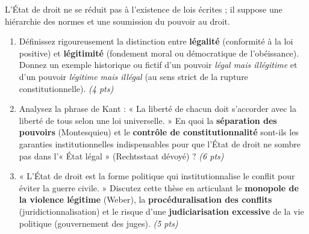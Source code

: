 \documentclass[11pt]{article}
\begin{document}
\begin{exercice}
L'État de droit ne se réduit pas à l'existence de lois écrites ; il suppose une hiérarchie des normes et une soumission du pouvoir au droit.

\begin{enumerate}
    \item Définissez rigoureusement la distinction entre \textbf{légalité} (conformité à la loi positive) et \textbf{légitimité} (fondement moral ou démocratique de l'obéissance). Donnez un exemple historique ou fictif d'un pouvoir \textit{légal mais illégitime} et d'un pouvoir \textit{légitime mais illégal} (au sens strict de la rupture constitutionnelle). \textit{(4 pts)}
    \item Analysez la phrase de Kant : « La liberté de chacun doit s'accorder avec la liberté de tous selon une loi universelle. » En quoi la \textbf{séparation des pouvoirs} (Montesquieu) et le \textbf{contrôle de constitutionnalité} sont-ils les garanties institutionnelles indispensables pour que l'État de droit ne sombre pas dans l'« État légal » (Rechtsstaat dévoyé) ? \textit{(6 pts)}
    \item « L'État de droit est la forme politique qui institutionnalise le conflit pour éviter la guerre civile. » Discutez cette thèse en articulant le \textbf{monopole de la violence légitime} (Weber), la \textbf{procéduralisation des conflits} (juridictionnalisation) et le risque d'une \textbf{judiciarisation excessive} de la vie politique (gouvernement des juges). \textit{(5 pts)}
\end{enumerate}
\end{exercice}
\end{document}
